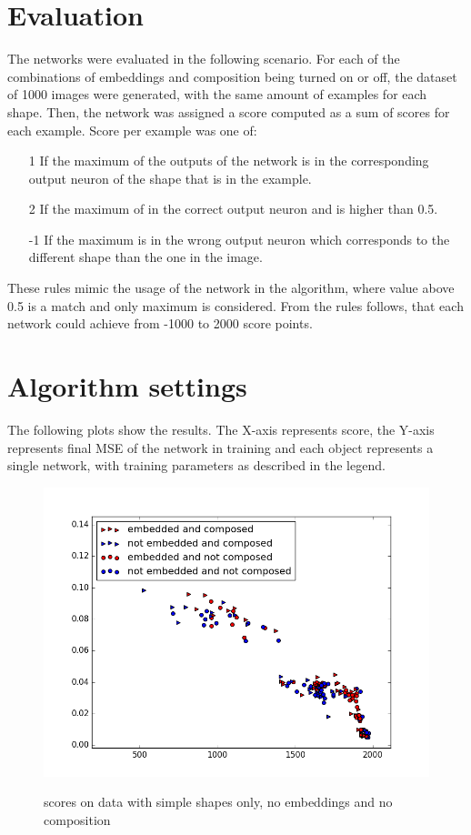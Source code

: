 \section{Evaluation}
The networks were evaluated in the following scenario. For each of the combinations of embeddings and composition being turned on or off, the dataset of 1000 images were generated, with the same amount of examples for each shape. Then, the network was assigned a score computed as a sum of scores for each example. Score per example was one of:

\begin{enumerate}
\item [1] If the maximum of the outputs of the network is in the corresponding output neuron of the shape that is in the example.
\item [2] If the maximum of in the correct output neuron and is higher than 0.5.
\item [-1] If the maximum is in the wrong output neuron which corresponds to the different shape than the one in the image.
\end{enumerate}

These rules mimic the usage of the network in the algorithm, where value above 0.5 is a match and only maximum is considered. From the rules follows, that each network could achieve from -1000 to 2000 score points. 

\section{Algorithm settings}
The following plots show the results. The X-axis represents score, the Y-axis represents final MSE of the network in training and each object represents a single network, with training parameters as described in the legend.

\begin{figure}[!htb]
\begin{center}
\label{fig:simples_com}
\includegraphics[width=\linewidth]{ext/figure_simples_com.png}
\end{center}
    \centering
    \caption{scores on data with simple shapes only, no embeddings and no composition}
\end{figure}

